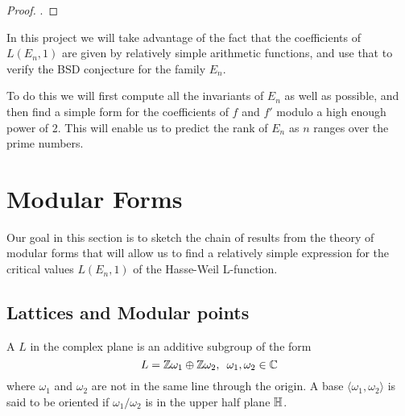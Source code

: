 \documentclass[12pt, a4paper]{amsart}
\begin{document}
\begin{proof}
  \cite[See][pages 325-328]{Tunnell}. 
\end{proof}
  
In this project we will take advantage of the fact that the coefficients of
$L(E_n,1)$ are given by relatively simple arithmetic functions, and use that
to verify the BSD conjecture for the family $E_n$.

To do this we will first compute all the invariants of $E_n$ as well as
possible, and then find a simple form for the coefficients of $f$ and $f'$ modulo
a high enough power of 2. This will enable us to predict the rank of $E_n$ as
$n$ ranges over the prime numbers.

\section{Modular Forms}

Our goal in this section is to sketch the chain of results from the theory of
modular forms that will allow us to find a relatively simple expression for the
critical values $L(E_n,1)$ of the Hasse-Weil L-function. 

\subsection{Lattices and Modular points}

\begin{defn}
  A  $L$ in the complex plane is an additive subgroup of the form
  \[L = {\mathbb Z}\omega_1 \oplus {\mathbb Z}\omega_2, \,\,\, \omega_1, \omega_2 \in {\mathbb C} \]
  where $\omega_1$ and $\omega_2$ are not in the same line through the origin.
  A base $\langle \omega_1, \omega_2 \rangle$ is said to be oriented if
  $\omega_1/\omega_2$ is in the upper half plane $\mathbb{H}$.
\end{defn}
\end{document}
